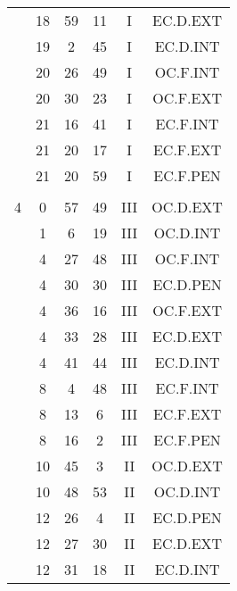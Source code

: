 \documentclass[12pt, a4paper]{article}
\begin{document}
\begin{multicols}{3}
{\begin{tabular}{c c c c c c}
	 	 	 	 & 18 & 59 & 11 & I & EC.D.EXT\\%
	 	 	 	 & 19 & 2 & 45 & I & EC.D.INT\\%
	 	 	 	 & 20 & 26 & 49 & I & OC.F.INT\\%
	 	 	 	 & 20 & 30 & 23 & I & OC.F.EXT\\%
	 	 	 	 & 21 & 16 & 41 & I & EC.F.INT\\%
	 	 	 	 & 21 & 20 & 17 & I & EC.F.EXT\\%
	 	 	 	 & 21 & 20 & 59 & I & EC.F.PEN\\%
	 	 	 	 & & & & & \\%
	 	 	 	4 & 0 & 57 & 49 & III & OC.D.EXT\\%
	 	 	 	 & 1 & 6 & 19 & III & OC.D.INT\\%
	 	 	 	 & 4 & 27 & 48 & III & OC.F.INT\\%
	 	 	 	 & 4 & 30 & 30 & III & EC.D.PEN\\%
	 	 	 	 & 4 & 36 & 16 & III & OC.F.EXT\\%
	 	 	 	 & 4 & 33 & 28 & III & EC.D.EXT\\%
	 	 	 	 & 4 & 41 & 44 & III & EC.D.INT\\%
	 	 	 	 & 8 & 4 & 48 & III & EC.F.INT\\%
	 	 	 	 & 8 & 13 & 6 & III & EC.F.EXT\\%
	 	 	 	 & 8 & 16 & 2 & III & EC.F.PEN\\%
	 	 	 	 & 10 & 45 & 3 & II & OC.D.EXT\\%
	 	 	 	 & 10 & 48 & 53 & II & OC.D.INT\\%
	 	 	 	 & 12 & 26 & 4 & II & EC.D.PEN\\%
	 	 	 	 & 12 & 27 & 30 & II & EC.D.EXT\\%
	 	 	 	 & 12 & 31 & 18 & II & EC.D.INT\\%

\end{tabular}}
\end{multicols}
\end{document}
